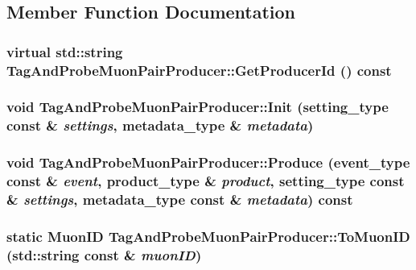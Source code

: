 \subsection{Member Function Documentation}
\hypertarget{classTagAndProbeMuonPairProducer_ae1f2dcdf85b71e242238c980b33fe8f0}{
\subsubsection[{GetProducerId}]{\setlength{\rightskip}{0pt plus 5cm}virtual std::string TagAndProbeMuonPairProducer::GetProducerId () const}}
\label{classTagAndProbeMuonPairProducer_ae1f2dcdf85b71e242238c980b33fe8f0}
\hypertarget{classTagAndProbeMuonPairProducer_a151e1f7a4f0b0b35102b56d1e8cf6fc3}{
\subsubsection[{Init}]{\setlength{\rightskip}{0pt plus 5cm}void TagAndProbeMuonPairProducer::Init (setting\_\-type const \& {\em settings}, \/  metadata\_\-type \& {\em metadata})}}
\label{classTagAndProbeMuonPairProducer_a151e1f7a4f0b0b35102b56d1e8cf6fc3}
\hypertarget{classTagAndProbeMuonPairProducer_a57e3e80a55930317c0cdfbd10fd81a39}{
\subsubsection[{Produce}]{\setlength{\rightskip}{0pt plus 5cm}void TagAndProbeMuonPairProducer::Produce (event\_\-type const \& {\em event}, \/  product\_\-type \& {\em product}, \/  setting\_\-type const \& {\em settings}, \/  metadata\_\-type const \& {\em metadata}) const}}
\label{classTagAndProbeMuonPairProducer_a57e3e80a55930317c0cdfbd10fd81a39}
\hypertarget{classTagAndProbeMuonPairProducer_aab5bed4d0e300d632d68ba3a93c3ea64}{
\subsubsection[{ToMuonID}]{\setlength{\rightskip}{0pt plus 5cm}static {\bf MuonID} TagAndProbeMuonPairProducer::ToMuonID (std::string const \& {\em muonID})}}

